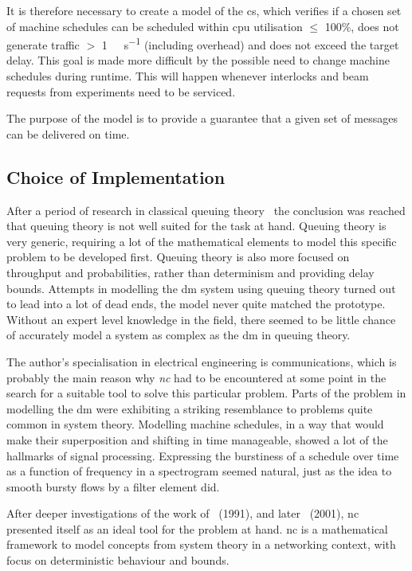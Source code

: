 It is therefore necessary to create a model of the  \gls{cs}, which verifies if a chosen set of machine schedules
can be scheduled within \gls{cpu} utilisation $\le$ 100\%, does not generate traffic $>$ \SI{1}{\giga\bit\per\second} (including overhead)
and does not exceed the target delay. This goal is made more difficult by the possible need to change machine schedules during runtime.
This will happen whenever interlocks and beam requests from experiments need to be serviced.
\par
The purpose of the model is to provide a guarantee that a given set of messages can be delivered on time.


\subsection{Choice of Implementation}
After a period of research in classical queuing theory~\cite{yue_advances_2009, daigle_queueing_2005}
the conclusion was reached that queuing theory is not well suited for the task at hand. Queuing theory is very generic, requiring a lot of the mathematical elements to model this specific problem
to be developed first. Queuing theory is also more focused on throughput and probabilities, rather than determinism and providing delay bounds.
Attempts in modelling the \gls{dm} system using queuing theory turned out to lead into a lot of dead ends, the model never quite matched the prototype.
Without an expert level knowledge in the field, there seemed to be little chance of accurately model a system as complex as the \gls{dm} in queuing theory.
\par
The author's specialisation in electrical engineering is communications, which is probably the main reason 
why \emph{\gls{nc}} had to be encountered at some point in the search for a suitable tool to solve this particular problem. Parts of the problem in modelling the \gls{dm}
were exhibiting a striking resemblance to problems quite common in system theory. Modelling machine schedules, in a way that would make their
superposition and shifting in time manageable, showed a lot of the hallmarks of signal processing. Expressing the burstiness of
a schedule over time as a function of frequency in a spectrogram seemed natural, just as the idea to smooth bursty flows by a filter element did.
\par
After deeper investigations of the work of~\cite{cruz_calculus_1991} (1991), and later~\cite{thiran_network_2001} (2001), \gls{nc} presented itself as an ideal tool for the problem at hand. 
\gls{nc} is a mathematical framework to model concepts from system theory in a networking context,
with focus on deterministic behaviour and bounds.

